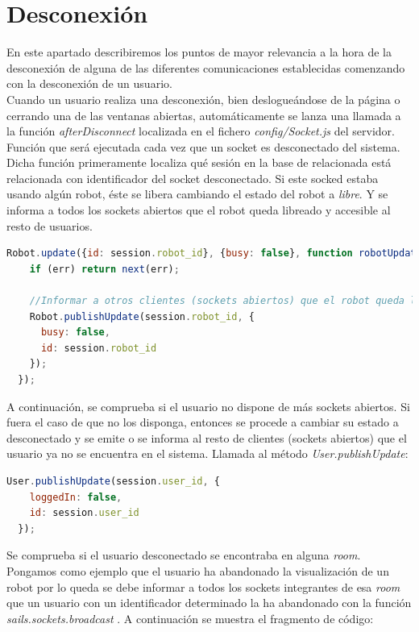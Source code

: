 \section { Desconexión }
\label{sec:deconexion}

En este apartado describiremos los puntos de mayor relevancia a la hora de la desconexión de alguna de las diferentes comunicaciones establecidas comenzando con la desconexión de un usuario.\\

Cuando un usuario realiza una desconexión, bien deslogueándose de la página o cerrando una de las ventanas abiertas, automáticamente se lanza una llamada a la 
función \emph{afterDisconnect} localizada en el fichero \emph{config/Socket.js} del servidor. Función que será ejecutada cada vez que un socket es desconectado del sistema.\\

Dicha función primeramente localiza qué sesión en la base de relacionada está relacionada con identificador del socket desconectado. Si este socked estaba usando algún robot, éste se libera cambiando el estado
del robot a \emph{libre}. Y se informa a todos los sockets abiertos que el robot queda libreado y accesible al resto de usuarios.\\

\begin{lstlisting}[language=JavaScript]
  Robot.update({id: session.robot_id}, {busy: false}, function robotUpdated(err) {
    if (err) return next(err);

    //Informar a otros clientes (sockets abiertos) que el robot queda liberado
    Robot.publishUpdate(session.robot_id, {
      busy: false,
      id: session.robot_id
    });
  });
\end{lstlisting}


A continuación, se comprueba si el usuario no dispone de más sockets abiertos. Si fuera el caso de que no los disponga, entonces se procede a cambiar su estado a desconectado y se emite o se informa al resto de clientes (sockets abiertos)
que el usuario ya no se encuentra en el sistema. Llamada al método \emph{User.publishUpdate}: \\

\begin{lstlisting}[language=JavaScript]
   User.publishUpdate(session.user_id, {
    loggedIn: false,
    id: session.user_id
  });
\end{lstlisting}


Se comprueba si el usuario desconectado se encontraba en alguna \emph{room}. Pongamos como ejemplo que el usuario ha abandonado la visualización de un robot por lo queda
se debe informar a todos los sockets integrantes de esa \emph{room} que un usuario con un identificador determinado la ha abandonado con la función \emph{ sails.sockets.broadcast }.
A continuación se muestra el fragmento de código:\\

